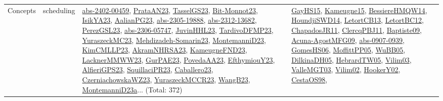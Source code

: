 {\begin{longtable}{lp{3cm}>{\raggedright}p{6cm}>{\raggedright}p{6cm}p{8cm}}
Concepts & scheduling & \href{articles/abs-2402-00459.pdf}{abs-2402-00459}\cite{abs-2402-00459}, \href{articles/PrataAN23.pdf}{PrataAN23}\cite{PrataAN23}, \href{papers/TasselGS23.pdf}{TasselGS23}\cite{TasselGS23}, \href{papers/Bit-Monnot23.pdf}{Bit-Monnot23}\cite{Bit-Monnot23}, \href{articles/IsikYA23.pdf}{IsikYA23}\cite{IsikYA23}, \href{papers/AalianPG23.pdf}{AalianPG23}\cite{AalianPG23}, \href{articles/abs-2305-19888.pdf}{abs-2305-19888}\cite{abs-2305-19888}, \href{articles/abs-2312-13682.pdf}{abs-2312-13682}\cite{abs-2312-13682}, \href{papers/PerezGSL23.pdf}{PerezGSL23}\cite{PerezGSL23}, \href{articles/abs-2306-05747.pdf}{abs-2306-05747}\cite{abs-2306-05747}, \href{papers/JuvinHHL23.pdf}{JuvinHHL23}\cite{JuvinHHL23}, \href{papers/TardivoDFMP23.pdf}{TardivoDFMP23}\cite{TardivoDFMP23}, \href{papers/YuraszeckMC23.pdf}{YuraszeckMC23}\cite{YuraszeckMC23}, \href{papers/Mehdizadeh-Somarin23.pdf}{Mehdizadeh-Somarin23}\cite{Mehdizadeh-Somarin23}, \href{articles/MontemanniD23.pdf}{MontemanniD23}\cite{MontemanniD23}, \href{papers/KimCMLLP23.pdf}{KimCMLLP23}\cite{KimCMLLP23}, \href{articles/AkramNHRSA23.pdf}{AkramNHRSA23}\cite{AkramNHRSA23}, \href{papers/KameugneFND23.pdf}{KameugneFND23}\cite{KameugneFND23}, \href{articles/LacknerMMWW23.pdf}{LacknerMMWW23}\cite{LacknerMMWW23}, \href{articles/GurPAE23.pdf}{GurPAE23}\cite{GurPAE23}, \href{papers/PovedaAA23.pdf}{PovedaAA23}\cite{PovedaAA23}, \href{papers/EfthymiouY23.pdf}{EfthymiouY23}\cite{EfthymiouY23}, \href{articles/AlfieriGPS23.pdf}{AlfieriGPS23}\cite{AlfieriGPS23}, \href{papers/SquillaciPR23.pdf}{SquillaciPR23}\cite{SquillaciPR23}, \href{articles/Caballero23.pdf}{Caballero23}\cite{Caballero23}, \href{articles/CzerniachowskaWZ23.pdf}{CzerniachowskaWZ23}\cite{CzerniachowskaWZ23}, \href{articles/YuraszeckMCCR23.pdf}{YuraszeckMCCR23}\cite{YuraszeckMCCR23}, \href{papers/WangB23.pdf}{WangB23}\cite{WangB23}, \href{articles/MontemanniD23a.pdf}{MontemanniD23a}\cite{MontemanniD23a}... (Total: 372) & \href{papers/GayHS15.pdf}{GayHS15}\cite{GayHS15}, \href{articles/Kameugne15.pdf}{Kameugne15}\cite{Kameugne15}, \href{papers/BessiereHMQW14.pdf}{BessiereHMQW14}\cite{BessiereHMQW14}, \href{papers/HoundjiSWD14.pdf}{HoundjiSWD14}\cite{HoundjiSWD14}, \href{papers/LetortCB13.pdf}{LetortCB13}\cite{LetortCB13}, \href{papers/LetortBC12.pdf}{LetortBC12}\cite{LetortBC12}, \href{papers/ChapadosJR11.pdf}{ChapadosJR11}\cite{ChapadosJR11}, \href{papers/ClercqPBJ11.pdf}{ClercqPBJ11}\cite{ClercqPBJ11}, \href{papers/Baptiste09.pdf}{Baptiste09}\cite{Baptiste09}, \href{papers/Acuna-AgostMFG09.pdf}{Acuna-AgostMFG09}\cite{Acuna-AgostMFG09}, \href{articles/abs-0907-0939.pdf}{abs-0907-0939}\cite{abs-0907-0939}, \href{papers/GomesHS06.pdf}{GomesHS06}\cite{GomesHS06}, \href{papers/MoffittPP05.pdf}{MoffittPP05}\cite{MoffittPP05}, \href{papers/WuBB05.pdf}{WuBB05}\cite{WuBB05}, \href{papers/DilkinaDH05.pdf}{DilkinaDH05}\cite{DilkinaDH05}, \href{papers/HebrardTW05.pdf}{HebrardTW05}\cite{HebrardTW05}, \href{papers/Vilim03.pdf}{Vilim03}\cite{Vilim03}, \href{papers/ValleMGT03.pdf}{ValleMGT03}\cite{ValleMGT03}, \href{papers/Vilim02.pdf}{Vilim02}\cite{Vilim02}, \href{papers/HookerY02.pdf}{HookerY02}\cite{HookerY02}, \href{papers/CestaOS98.pdf}{CestaOS98}\cite{CestaOS98}, 
\end{longtable}}
